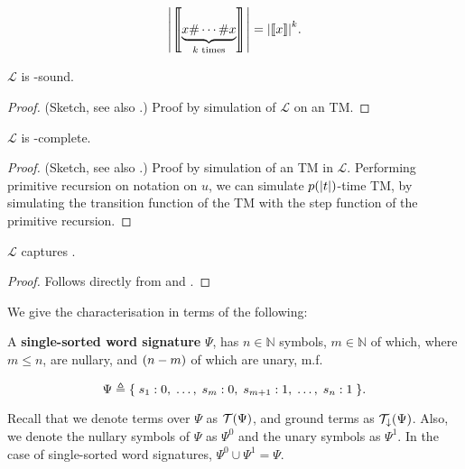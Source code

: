 $${\mathopen{}\left|{{\mathopen{}\left\llbracket{\underbrace{x \ensuremath{\mathtt{\#}}{} \cdots \ensuremath{\mathtt{\#}}{} x}_{\text{$k$ times}}}\right\rrbracket\mathclose{}}}\right|\mathclose{}} =
{\mathopen{}\left|{{\mathopen{}\left\llbracket{x}\right\rrbracket\mathclose{}}}\right|\mathclose{}}^k.$$

\begin{lemma} \label{lem:l-fptime-sound} $\mathcal{L}$ is \FPTIME{}-sound.
\end{lemma}

\begin{proof} (Sketch, see also \cite{rose-1984, tourlakis-1984, clote-1999}.)
Proof by simulation of $\mathcal{L}$ on an \FPTIME{} TM.   \end{proof}

\begin{lemma} \label{lem:l-fptime-complete} $\mathcal{L}$ is
\FPTIME{}-complete. \end{lemma}

\begin{proof} (Sketch, see also \cite{rose-1984}.) Proof by simulation of an
\FPTIME{} TM in $\mathcal{L}$. Performing primitive recursion on notation on
$u$, we can simulate $p{\mathopen{}\left({{\mathopen{}\left|{t}\right|\mathclose{}}}\right)\mathclose{}}$-time TM, by simulating the transition
function of the TM with the step function of the primitive recursion.
 \end{proof}

\begin{theorem} \label{thm:l-captures-fptime} $\mathcal{L}$ captures \FPTIME{}.
\end{theorem}

\begin{proof} Follows directly from  and
. \end{proof}

We give the characterisation in terms of the following:

\begin{definition} A \textbf{single-sorted word signature} $\Psi$,
has $n \in \mathbb{N}$ symbols, $m \in \mathbb{N}$ of which, where $m \leq n$,
are nullary, and ${\mathopen{}\left({n-m}\right)\mathclose{}}$ of which are unary, m.f.

$$\Psi \triangleq \mathopen{}\left\{\mathrel{}{s_1 : 0, \; \ldots, \; s_m : 0, \; s_{m+1} : 1, \;
\ldots, \; s_n : 1}\mathrel{}\right\}\mathclose{}.$$

\end{definition}

Recall that we denote terms over $\Psi$ as $\mathcal{T}{\mathopen{}\left({\Psi}\right)\mathclose{}}$, and ground
terms as $\mathcal{T}_\downarrow{\ensuremath{\mathopen{}\left({\Psi}\right)\mathclose{}}}$. Also, we denote the nullary symbols
of $\Psi$ as $\Psi^0$ and the unary symbols as $\Psi^1$. In the case of
single-sorted word signatures, $\Psi^0 \cup \Psi^1 = \Psi$.

